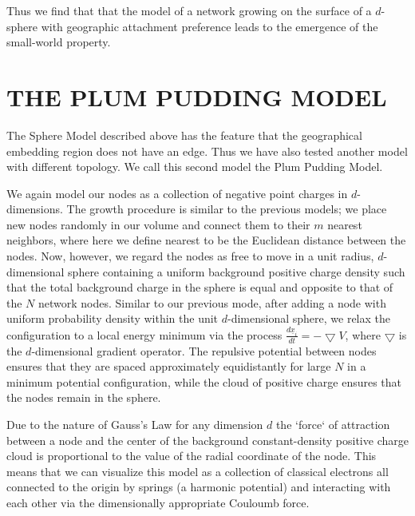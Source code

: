 \documentclass[aps,pre,reprint,superscriptaddress,amsmath,amssymb,nofootinbib]{revtex4-1}
\begin{document}
Thus we find that that the model of a network growing on the surface of a $d$-sphere with geographic attachment preference leads to the emergence of the small-world property.

\section{THE PLUM PUDDING MODEL}
The Sphere Model described above has the feature that the geographical embedding region does not have an edge.
Thus we have also tested another model with different topology.
We call this second model the Plum Pudding Model.

We again model our nodes as a collection of negative point charges in $d$-dimensions.
The growth procedure is similar to the previous models; we place new nodes randomly in our volume and connect them to their $m$ nearest neighbors, where here we define nearest to be the Euclidean distance between the nodes.
Now, however, we regard the nodes as free to move in a unit radius, $d$-dimensional sphere containing a uniform background positive charge density such that the total background charge in the sphere is equal and opposite to that of the $N$ network nodes.
Similar to our previous mode, after adding a node with uniform probability density within the unit $d$-dimensional sphere, we relax the configuration to a local energy minimum via the process $\frac{d\underline{x}_i}{dt} = -\bigtriangledown V$, where $\bigtriangledown$ is the $d$-dimensional gradient operator.
The repulsive potential between nodes ensures that they are spaced approximately equidistantly for large $N$ in a minimum potential configuration, while the cloud of positive charge ensures that the nodes remain in the sphere.

Due to the nature of Gauss's Law for any dimension $d$ the `force` of attraction between a node and the center of the background constant-density positive charge cloud is proportional to the value of the radial coordinate of the node.
This means that we can visualize this model as a collection of classical electrons all connected to the origin by springs (a harmonic potential) and interacting with each other via the dimensionally appropriate Couloumb force.  
\end{document}
